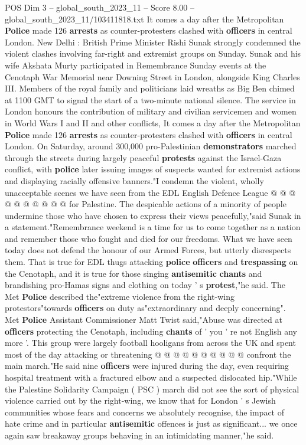 \begin{textsample}{POS Dim 3 – global\_south\_2023\_11 – Score 8.00 – global\_south\_2023\_11/103411818.txt}  \label{ex:f3_pos_377}
It comes a day after the Metropolitan \textbf{Police} made 126 \textbf{arrests} as counter-protesters clashed with \textbf{officers} in central London.
New Delhi : British Prime Minister Rishi Sunak strongly condemned the violent clashes involving far-right and extremist groups on Sunday.
Sunak and his wife Akshata Murty participated in Remembrance Sunday events at the Cenotaph War Memorial near Downing Street in London, alongside King Charles III.
Members of the royal family and politicians laid wreaths as Big Ben chimed at 1100 GMT to signal the start of a two-minute national silence.
The service in London honours the contribution of military and civilian servicemen and women in World Wars I and II and other conflicts, It comes a day after the Metropolitan \textbf{Police} made 126 \textbf{arrests} as counter-protesters clashed with \textbf{officers} in central London.
On Saturday, around 300,000 pro-Palestinian \textbf{demonstrators} marched through the streets during largely peaceful \textbf{protests} against the Israel-Gaza conflict, with \textbf{police} later issuing images of suspects wanted for extremist actions and displaying racially offensive banners."I condemn the violent, wholly unacceptable scenes we have seen from the EDL English Defence League @ @ @ @ @ @ @ @ @ @ for Palestine.
The despicable actions of a minority of people undermine those who have chosen to express their views peacefully,"said Sunak in a statement."Remembrance weekend is a time for us to come together as a nation and remember those who fought and died for our freedoms.
What we have seen today does not defend the honour of our Armed Forces, but utterly disrespects them.
That is true for EDL thugs attacking \textbf{police} \textbf{officers} and \textbf{trespassing} on the Cenotaph, and it is true for those singing \textbf{antisemitic} \textbf{chants} and brandishing pro-Hamas signs and clothing on today ' s \textbf{protest},"he said.
The Met \textbf{Police} described the"extreme violence from the right-wing protestors"towards \textbf{officers} on duty as"extraordinary and deeply concerning".
Met \textbf{Police} Assistant Commissioner Matt Twist said,"Abuse was directed at \textbf{officers} protecting the Cenotaph, including \textbf{chants} of ' you ' re not English any more '.
This group were largely football hooligans from across the UK and spent most of the day attacking or threatening @ @ @ @ @ @ @ @ @ @ confront the main march."He said nine \textbf{officers} were injured during the day, even requiring hospital treatment with a fractured elbow and a suspected dislocated hip."While the Palestine Solidarity Campaign ( PSC ) march did not see the sort of physical violence carried out by the right-wing, we know that for London ' s Jewish communities whose fears and concerns we absolutely recognise, the impact of hate crime and in particular \textbf{antisemitic} offences is just as significant... we once again saw breakaway groups behaving in an intimidating manner,"he said.

\end{textsample}
